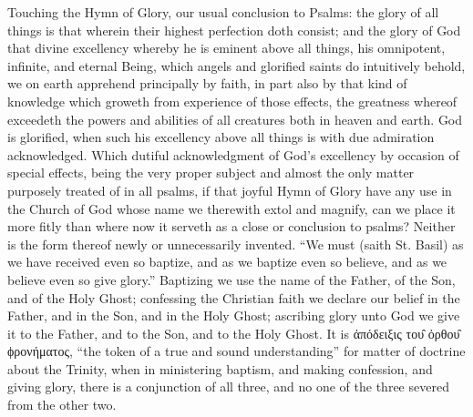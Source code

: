 Touching the Hymn of Glory, our usual conclusion to Psalms: the glory of all things is that wherein their highest perfection doth consist; and the glory of God that divine excellency whereby he is eminent above all things, his omnipotent, infinite, and eternal Being, which angels and glorified saints do intuitively behold, we on earth apprehend principally by faith, in part also by that kind of knowledge which groweth from experience of those effects, the greatness whereof exceedeth the powers and abilities of all creatures both in heaven and earth. God is glorified, when such his excellency above all things is with due admiration acknowledged. Which dutiful acknowledgment of God’s excellency by occasion of special effects, being the very proper subject and almost the only matter purposely treated of in all psalms, if that joyful Hymn of Glory have any use in the Church of God whose name we therewith extol and magnify, can we place it more fitly than where now it serveth as a close or conclusion to psalms?
Neither is the form thereof newly or unnecessarily  invented.  “We must (saith St. Basil) as we have received even so baptize, and as we baptize even so believe, and as we believe even so give glory.” Baptizing we use the name of the Father, of the Son, and of the Holy Ghost; confessing the Christian faith we declare our belief in the Father, and in the Son, and in the Holy Ghost; ascribing glory unto God we give it to the Father, and to the Son, and to the Holy Ghost. It is ἀπόδειξις του̑ ὀρθου̑ ϕρονήματος, “the token of a true and sound understanding” for matter of doctrine about the Trinity, when in ministering baptism, and making confession, and giving glory, there is a conjunction of all three, and no one of the three severed from the other two.
